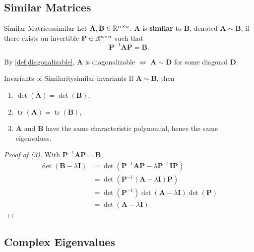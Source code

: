 \subsection{Similar Matrices}

\begin{definition}{Similar Matrices}{similar}
  Let $\mathbf{A}, \mathbf{B} \in \mathbb{R}^{n \times n}$. $\mathbf{A}$ is \textbf{similar} to $\mathbf{B}$, denoted $\mathbf{A} \sim \mathbf{B}$, if there exists an invertible $\mathbf{P} \in \mathbb{R}^{n \times n}$ such that
  \[
    \mathbf{P}^{-1} \mathbf{A} \mathbf{P} = \mathbf{B}.
  \]
\end{definition}

\begin{remark}
  By \ref{def:diagonalizable}, $\mathbf{A}$ is diagonalizable $\iff$ $\mathbf{A} \sim \mathbf{D}$ for some diagonal $\mathbf{D}$.
\end{remark}

\begin{theorem}{Invariants of Similarity}{similar-invariants}
  If $\mathbf{A} \sim \mathbf{B}$, then
  \begin{enumerate}
    \item $\det(\mathbf{A}) = \det(\mathbf{B})$,
    \item $\operatorname{tr}(\mathbf{A}) = \operatorname{tr}(\mathbf{B})$,
    \item $\mathbf{A}$ and $\mathbf{B}$ have the same characteristic polynomial, hence the same eigenvalues.
  \end{enumerate}
\end{theorem}

\begin{proof}[Proof of (3)]
  With $\mathbf{P}^{-1} \mathbf{A} \mathbf{P} = \mathbf{B}$,
  \begin{align*}
    \det(\mathbf{B} - \lambda \mathbf{I})
     & = \det(\mathbf{P}^{-1} \mathbf{A} \mathbf{P} - \lambda \mathbf{P}^{-1} \mathbf{I} \mathbf{P}) \\
     & = \det(\mathbf{P}^{-1} (\mathbf{A} - \lambda \mathbf{I}) \mathbf{P})                          \\
     & = \det(\mathbf{P}^{-1}) \det(\mathbf{A} - \lambda \mathbf{I}) \det(\mathbf{P})                \\
     & = \det(\mathbf{A} - \lambda \mathbf{I}).
  \end{align*}
\end{proof}

\subsection{Complex Eigenvalues}


